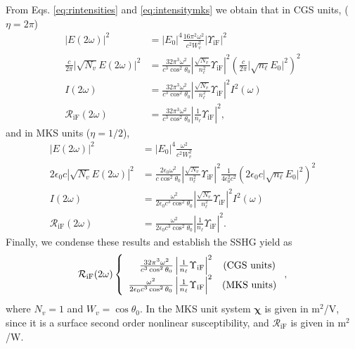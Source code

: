 From Eqs. \eqref{eq:rintensities} and \eqref{eq:intensitymks} we obtain that in
CGS units, ($\eta=2\pi$)
\begin{align}\label{eq:r01}
\vert E(2\omega)\vert^{2} &=
\vert E_{0}\vert^{4}\frac{16\pi^{2}\omega^{2}}{c^{2}W^2_{v}}
\vert\Upsilon_{\mathrm{iF}}\vert^{2}\nonumber\\
\frac{c}{2\pi}\vert\sqrt{N_{v}}E(2\omega)\vert^{2} &=
\frac{32\pi^{3}\omega^{2}}{c^{3}\cos^2\theta_{0}}
\left\vert\frac{\sqrt{N_{v}}}{n^{2}_{\ell}}\Upsilon_{\mathrm{iF}}\right\vert^{2} 
\left(\frac{c}{2\pi}\vert\sqrt{n_{\ell}}E_{0}\vert^{2}\right)^{2}\nonumber\\ 
I(2\omega) &=
\frac{32\pi^{3}\omega^{2}}{c^{3}\cos^2\theta_{0}}
\left\vert\frac{\sqrt{N_{v}}}{n^{2}_{\ell}}\Upsilon_{\mathrm{iF}}\right\vert^{2}
I^{2}(\omega)\nonumber\\
\mathcal{R}_{\mathrm{iF}}(2\omega) &=
\frac{32\pi^{3}\omega^{2}}{c^{3}\cos^2\theta_{0}}
\left\vert\frac{1}{n_{\ell}}\Upsilon_{\mathrm{iF}}\right\vert^{2},
\end{align} 
and in MKS units ($\eta=1/2$),
\begin{align}\label{r01m}
\vert E(2\omega)\vert^{2} &=
\vert E_{0}\vert^{4}\frac{\omega^{2}}{c^{2}W^{2}_{v}}\nonumber\\
2\epsilon_{0}c|\sqrt{N_{v}}E(2\omega)|^{2} &=
\frac{2\epsilon_{0}\omega^{2}}{c\cos^{2}\theta_{0}}
\left\vert\frac{\sqrt{N_{v}}}{n^{2}_{\ell}}\Upsilon_{\mathrm{iF}}\right\vert^{2} 
\frac{1}{4\epsilon^{2}_0c^{2}}
\left(2\epsilon_{0}c\vert\sqrt{n_{\ell}}E_{0}\vert^{2}\right)^{2}\nonumber\\
I(2\omega) &= 
\frac{\omega^{2}}{2\epsilon_{0}c^3\cos^{2}\theta_{0}}
\left\vert\frac{\sqrt{N_{v}}}{n^{2}_{\ell}}\Upsilon_{\mathrm{iF}}\right\vert^{2}
I^{2}(\omega)\nonumber\\
\mathcal{R}_{\mathrm{iF}}(2\omega) &=
\frac{\omega^{2}}{2\epsilon_{0}c^3\cos^{2}\theta_{0}}
\left\vert  \frac{1}{n_{\ell}}\Upsilon_{\mathrm{iF}}\right\vert^{2}.
\end{align}
Finally, we condense these results and establish the SSHG yield as
\begin{equation}\label{eq:mc6}
\mathcal{R}_{\mathrm{iF}}(2\omega) 
\left\{
\begin{array}{ r c } 
\frac{32\pi^{3}\omega^{2}}{c^{3}\cos^{2}\theta_{0}}
\left\vert\frac{1}{n_{\ell}}\Upsilon_{\mathrm{iF}}\right\vert^{2} 
& \text{(CGS units)} \\
\frac{\omega^{2}}{2\epsilon_{0}c^3\cos^{2}\theta_{0}}
\left\vert\frac{1}{n_{\ell}}\Upsilon_{\mathrm{iF}}\right\vert^{2} 
& \text{(MKS units)} 
\end{array}
\right.,
\end{equation}
where $N_{v}=1$ and $W_{v}=\cos\theta_{0}$. In the MKS unit system
$\boldsymbol{\chi}$ is given in m$^{2}$/V, since it is a surface second order
nonlinear susceptibility, and $\mathcal{R}_{\mathrm{iF}}$ is given in m$^2$/W.

